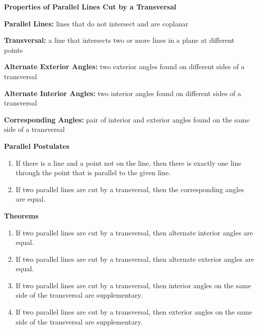 \begin{center}
\textbf{Properties of Parallel Lines Cut by a Transversal 
}
\end{center}

\vspce

\textbf{Parallel Lines:} lines that do not intersect and are coplanar

\textbf{Transversal:} a line that intersects two or more lines in a plane at different points

\textbf{Alternate Exterior Angles:} two exterior angles found on different sides of a transversal

\textbf{Alternate Interior Angles:} two interior angles found on different sides of a transversal

\textbf{Corresponding Angles:} pair of interior and exterior angles found on the same side of a transversal

\vspce 

\textbf{Parallel Postulates}
\begin{enumerate}[label = \arabic*. ]
\item If there is a line and a point not on the line, then there is exactly one line through the point that is
parallel to the given line.
\item If two parallel lines are cut by a transversal, then the corresponding angles are equal. 
\end{enumerate}   

\vspce 

\textbf{Theorems}
\begin{enumerate}[label = \arabic*. ]
\item If two parallel lines are cut by a transversal, then alternate interior angles are equal.
\item If two parallel lines are cut by a transversal, then alternate exterior angles are equal.
\item If two parallel lines are cut by a transversal, then interior angles on the same side of the transversal are supplementary.
\item If two parallel lines are cut by a transversal, then exterior angles on the same side of the transversal are supplementary.
\end{enumerate}  





